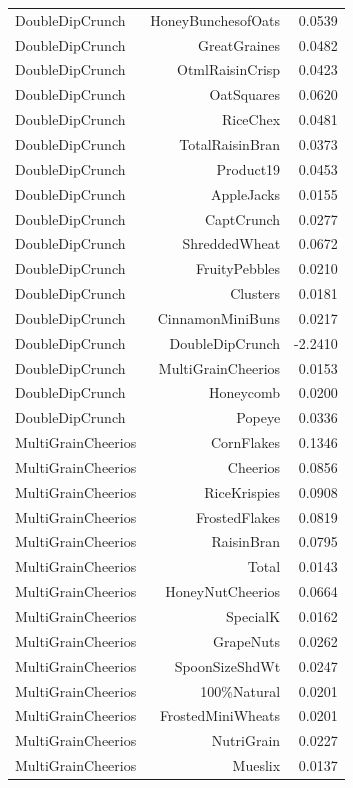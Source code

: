 \begin{longtable}{@{}lrr@{}}
DoubleDipCrunch & HoneyBunchesofOats & 0.0539 \\
DoubleDipCrunch & GreatGraines & 0.0482 \\
DoubleDipCrunch & OtmlRaisinCrisp & 0.0423 \\
DoubleDipCrunch & OatSquares & 0.0620 \\
DoubleDipCrunch & RiceChex & 0.0481 \\
DoubleDipCrunch & TotalRaisinBran & 0.0373 \\
DoubleDipCrunch & Product19 & 0.0453 \\
DoubleDipCrunch & AppleJacks & 0.0155 \\
DoubleDipCrunch & CaptCrunch & 0.0277 \\
DoubleDipCrunch & ShreddedWheat & 0.0672 \\
DoubleDipCrunch & FruityPebbles & 0.0210 \\
DoubleDipCrunch & Clusters & 0.0181 \\
DoubleDipCrunch & CinnamonMiniBuns & 0.0217 \\
DoubleDipCrunch & DoubleDipCrunch & -2.2410 \\
DoubleDipCrunch & MultiGrainCheerios & 0.0153 \\
DoubleDipCrunch & Honeycomb & 0.0200 \\
DoubleDipCrunch & Popeye & 0.0336 \\
MultiGrainCheerios & CornFlakes & 0.1346 \\
MultiGrainCheerios & Cheerios & 0.0856 \\
MultiGrainCheerios & RiceKrispies & 0.0908 \\
MultiGrainCheerios & FrostedFlakes & 0.0819 \\
MultiGrainCheerios & RaisinBran & 0.0795 \\
MultiGrainCheerios & Total & 0.0143 \\
MultiGrainCheerios & HoneyNutCheerios & 0.0664 \\
MultiGrainCheerios & SpecialK & 0.0162 \\
MultiGrainCheerios & GrapeNuts & 0.0262 \\
MultiGrainCheerios & SpoonSizeShdWt & 0.0247 \\
MultiGrainCheerios & 100\%Natural & 0.0201 \\
MultiGrainCheerios & FrostedMiniWheats & 0.0201 \\
MultiGrainCheerios & NutriGrain & 0.0227 \\
MultiGrainCheerios & Mueslix & 0.0137 \\

\end{longtable}
